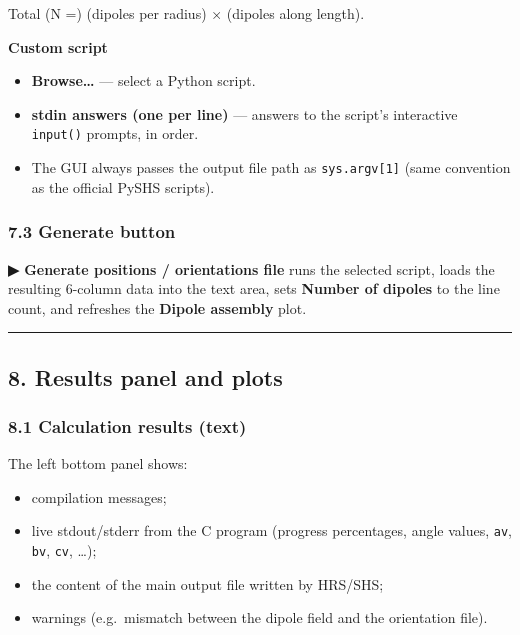 Total (N =) (dipoles per radius) × (dipoles along length).

\textbf{Custom script}

\begin{itemize}
\tightlist
\item
  \textbf{Browse\ldots{}} --- select a Python script.\\
\item
  \textbf{stdin answers (one per line)} --- answers to the script's
  interactive \texttt{input()} prompts, in order.\\
\item
  The GUI always passes the output file path as \texttt{sys.argv{[}1{]}}
  (same convention as the official PySHS scripts).
\end{itemize}

\hypertarget{generate-button}{%
\subsubsection{7.3 Generate button}\label{generate-button}}

\textbf{▶ Generate positions / orientations file} runs the selected
script, loads the resulting 6-column data into the text area, sets
\textbf{Number of dipoles} to the line count, and refreshes the
\textbf{Dipole assembly} plot.

\begin{center}\rule{0.5\linewidth}{0.5pt}\end{center}

\hypertarget{results-panel-and-plots}{%
\subsection{8. Results panel and plots}\label{results-panel-and-plots}}

\hypertarget{calculation-results-text}{%
\subsubsection{8.1 Calculation results
(text)}\label{calculation-results-text}}

The left bottom panel shows:

\begin{itemize}
\tightlist
\item
  compilation messages;\\
\item
  live stdout/stderr from the C program (progress percentages, angle
  values, \texttt{av}, \texttt{bv}, \texttt{cv}, \ldots);\\
\item
  the content of the main output file written by HRS/SHS;\\
\item
  warnings (e.g.~mismatch between the dipole field and the orientation
  file).
\end{itemize}

